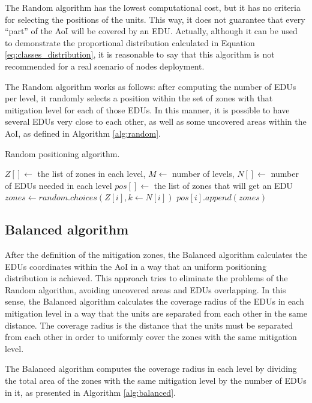 \begin{refsection}
The Random algorithm has the lowest computational cost, but it has no criteria for selecting the positions of the units. This way, it does not guarantee that every ``part'' of the AoI will be covered by an EDU. Actually, although it can be used to demonstrate the proportional distribution calculated in Equation \ref{eq:classes_distribution}, it is reasonable to say that this algorithm is not recommended for a real scenario of nodes deployment. 

The Random algorithm works as follows: after computing the number of EDUs per level, it randomly selects a position within the set of zones with that mitigation level for each of those EDUs. In this manner, it is possible to have several EDUs very close to each other, as well as some uncovered areas within the AoI, as defined in Algorithm \ref{alg:random}.

\begin{algorithm}[ht]
    \caption{Random positioning algorithm.}
    \label{alg:random}
    \begin{algorithmic}
        \REQUIRE $Z[] \gets$ the list of zones in each level, $M \gets$ number of levels, $N[] \gets$ number of EDUs needed in each level
        \ENSURE $pos[] \gets$ the list of zones that will get an EDU
            \STATE $zones \gets random.choices(Z[i], k \gets N[i])$
            \STATE $pos[i].append(zones)$
        \ENDFOR
    \end{algorithmic}
\end{algorithm}


\subsection {Balanced algorithm}

After the definition of the mitigation zones, the Balanced algorithm calculates the EDUs coordinates within the AoI in a way that an uniform positioning distribution is achieved. This approach tries to eliminate the problems of the Random algorithm, avoiding uncovered areas and EDUs overlapping. In this sense, the Balanced algorithm calculates the coverage radius of the EDUs in each mitigation level in a way that the units are separated from each other in the same distance. The coverage radius is the distance that the units must be separated from each other in order to uniformly cover the zones with the same mitigation level. 

The Balanced algorithm computes the coverage radius in each level by dividing the total area of the zones with the same mitigation level by the number of EDUs in it, as presented in Algorithm \ref{alg:balanced}. 


\end{refsection}
